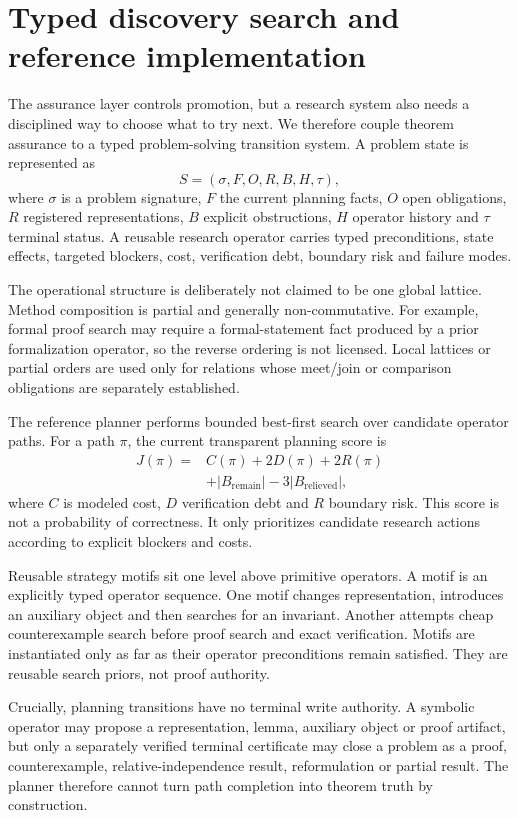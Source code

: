 \section{Typed discovery search and reference implementation}

The assurance layer controls promotion, but a research system also needs a disciplined way to choose what to try next. We therefore couple theorem assurance to a typed problem-solving transition system. A problem state is represented as
\[
S=(\sigma,F,O,R,B,H,\tau),
\]
where $\sigma$ is a problem signature, $F$ the current planning facts, $O$ open obligations, $R$ registered representations, $B$ explicit obstructions, $H$ operator history and $\tau$ terminal status. A reusable research operator carries typed preconditions, state effects, targeted blockers, cost, verification debt, boundary risk and failure modes.

The operational structure is deliberately not claimed to be one global lattice. Method composition is partial and generally non-commutative. For example, formal proof search may require a formal-statement fact produced by a prior formalization operator, so the reverse ordering is not licensed. Local lattices or partial orders are used only for relations whose meet/join or comparison obligations are separately established.

The reference planner performs bounded best-first search over candidate operator paths. For a path $\pi$, the current transparent planning score is
\[
\begin{aligned}
J(\pi)={}&C(\pi)+2D(\pi)+2R(\pi)\\
&+|B_{\mathrm{remain}}|-3|B_{\mathrm{relieved}}|,
\end{aligned}
\]
where $C$ is modeled cost, $D$ verification debt and $R$ boundary risk. This score is not a probability of correctness. It only prioritizes candidate research actions according to explicit blockers and costs.

Reusable strategy motifs sit one level above primitive operators. A motif is an explicitly typed operator sequence. One motif changes representation, introduces an auxiliary object and then searches for an invariant. Another attempts cheap counterexample search before proof search and exact verification. Motifs are instantiated only as far as their operator preconditions remain satisfied. They are reusable search priors, not proof authority.

Crucially, planning transitions have no terminal write authority. A symbolic operator may propose a representation, lemma, auxiliary object or proof artifact, but only a separately verified terminal certificate may close a problem as a proof, counterexample, relative-independence result, reformulation or partial result. The planner therefore cannot turn path completion into theorem truth by construction.

